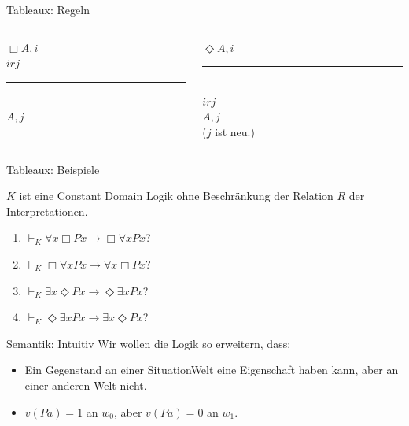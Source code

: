 \documentclass[12pt]{beamer}
\newcommand{\prule}{\vspace{-8pt}\rule{50pt}{0.5pt}}
\begin{document}
\begin{frame}{Tableaux: Regeln}
  \begin{columns}
    \begin{column}[t]{.5 \linewidth}
      \begin{center}
        $\Box A, i$ \\
        $irj$ \\
        \prule \\
        $A, j$
      \end{center}
    \end{column}
    \begin{column}[t]{.5 \linewidth}
      \begin{center}
        $\Diamond A, i$\\
        \prule \\
        $irj$ \\
        $A,j$ \\
        ($j$ ist neu.)
      \end{center}

    \end{column}
  \end{columns}

  
\end{frame}



\begin{frame}{Tableaux: Beispiele}

  $K$ ist eine Constant Domain Logik ohne Beschränkung der Relation $R$ der
  Interpretationen.
  \begin{enumerate}[<+->]
  \item $\vdash_K \forall x \Box Px \to \Box \forall x Px$?
  \item $\vdash_K \Box \forall x Px \to \forall x \Box Px$?
  \item $\vdash_K \exists x \Diamond Px \to \Diamond \exists x Px$?
  \item $\vdash_K \Diamond \exists x Px \to \exists x \Diamond Px$?
  \end{enumerate}


\end{frame}

\begin{frame}{Semantik: Intuitiv}
  Wir wollen die Logik so erweitern, dass: \pause
  \begin{itemize}[<+->]
  \item Ein Gegenstand an einer SituationWelt eine Eigenschaft haben
    kann, aber an einer anderen Welt nicht.
  \item $v(Pa) = 1$ an $w_0$, aber $v(Pa) = 0$ an $w_1$.
  \end{itemize}
\end{frame}
\end{document}
